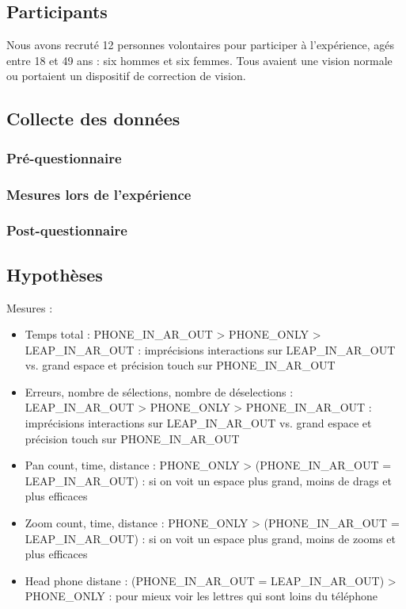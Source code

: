 \subsection{Participants}
Nous avons recruté 12 personnes volontaires pour participer à l'expérience, agés entre 18 et 49 ans : six hommes et six femmes. Tous avaient une vision normale ou portaient un dispositif de correction de vision.

\subsection{Collecte des données}
\subsubsection{Pré-questionnaire}

\subsubsection{Mesures lors de l'expérience}

\subsubsection{Post-questionnaire}

\subsection{Hypothèses}
Mesures :
\begin{itemize}
  \item Temps total : PHONE_IN_AR_OUT > PHONE_ONLY > LEAP_IN_AR_OUT : imprécisions interactions sur LEAP_IN_AR_OUT vs. grand espace et précision touch sur PHONE_IN_AR_OUT
  \item Erreurs, nombre de sélections, nombre de déselections : LEAP_IN_AR_OUT > PHONE_ONLY > PHONE_IN_AR_OUT : imprécisions interactions sur LEAP_IN_AR_OUT vs. grand espace et précision touch sur PHONE_IN_AR_OUT
  \item Pan count, time, distance : PHONE_ONLY > (PHONE_IN_AR_OUT = LEAP_IN_AR_OUT) : si on voit un espace plus grand, moins de drags et plus efficaces
  \item Zoom count, time, distance : PHONE_ONLY > (PHONE_IN_AR_OUT = LEAP_IN_AR_OUT) : si on voit un espace plus grand, moins de zooms et plus efficaces
  \item Head phone distane : (PHONE_IN_AR_OUT = LEAP_IN_AR_OUT) > PHONE_ONLY : pour mieux voir les lettres qui sont loins du téléphone
\end{itemize}

